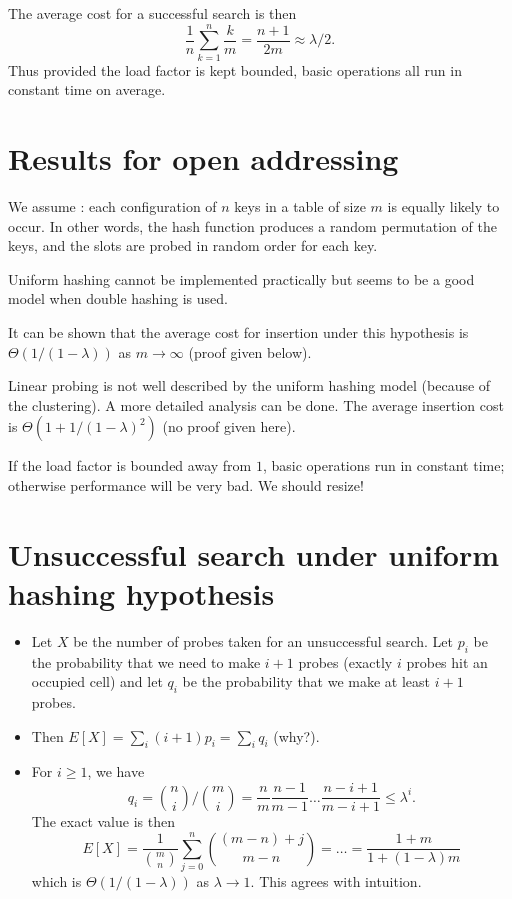 The average cost for a successful search is then 
$$
\frac{1}{n} \sum_{k=1}^n \frac{k}{m} = \frac{n+1}{2m} \approx \lambda/2 \text{.}
$$
Thus provided the load factor is kept bounded, basic operations all run in 
constant time on average. 

\section{Results for open addressing}
We assume : each configuration of 
$n$ keys in a table of size $m$ is equally likely to occur. In other words, the 
hash function produces a random permutation of the keys, and the slots are 
probed in random order for each key.

Uniform hashing cannot be implemented practically but seems to be a good 
model when double hashing is used.

It can be shown that the average cost for insertion under this 
hypothesis is $\Theta(1/(1-\lambda))$ as $m \to \infty$ (proof given below).

Linear probing is not well described by the uniform hashing model 
(because of the clustering). A more detailed analysis can be done. 
The average insertion cost is $\Theta(1 + 1/(1 - \lambda)^2)$ (no proof given here).

If the load factor is bounded away from $1$, basic operations 
run in constant time; otherwise performance will be very bad. We should resize!


\section{Unsuccessful search under uniform hashing hypothesis}
\begin{itemize}
\item Let $X$ be the number of probes taken for an unsuccessful search. 
Let $p_i$ be the probability that we need to make $i+1$ probes 
(exactly $i$ probes hit an occupied cell) and let $q_i$ be the probability 
that we make at least $i+1$ probes. 
\item Then 
$E[X] = \sum_i (i+1) p_i = \sum_i q_i$ (why?).
\item For $i \geq 1$, we have
$$ q_i = \binom{n}{i}/\binom{m}{i} = \frac{n}{m} \frac{n-1}{m-1} 
\dots \frac{n - i + 1}{m - i + 1}  \leq \lambda^i\text{.}$$
The exact value is then
$$
E[X] = \frac{1}{\binom{m}{n}} \sum_{j=0}^n \binom{(m-n)+j}{m-n} = 
\dots = \frac{1+m}{1+(1-\lambda)m}
$$
which is $\Theta(1/(1 - \lambda))$ as $\lambda \to 1$. This agrees with 
intuition.
\end{itemize}

